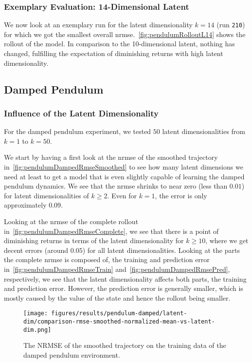 		\subsubsection{Exemplary Evaluation: 14-Dimensional Latent}
			\label{subsubsec:pendulumL14}

			We now look at an exemplary run for the latent dimensionality \( k = 14 \) (run \texttt{210}) for which we got the smallest overall \ac{nrmse}.~\autoref{fig:pendulumRolloutL14} shows the rollout of the model. In comparison to the 10-dimensional latent, nothing has changed, fulfilling the expectation of diminishing returns with high latent dimensionality.

	\subsection{Damped Pendulum}
		\subsubsection{Influence of the Latent Dimensionality}
			For the damped pendulum experiment, we tested \(50\) latent dimensionalities from \( k = 1 \) to \( k = 50 \).

			We start by having a first look at the \ac{nrmse} of the smoothed trajectory in~\autoref{fig:pendulumDampedRmseSmoothed} to see how many latent dimensions we need at least to get a model that is even slightly capable of learning the damped pendulum dynamics. We see that the \ac{nrmse} shrinks to near zero (less than \( 0.01 \)) for latent dimensionalities of \( k \geq 2 \). Even for \( k = 1 \), the error is only approximately \( 0.09 \).

			Looking at the \ac{nrmse} of the complete rollout in~\autoref{fig:pendulumDampedRmseComplete}, we see that there is a point of diminishing returns in terms of the latent dimensionality for \( k \geq 10 \), where we get decent errors (around \( 0.05 \)) for all latent dimensionalities. Looking at the parts the complete \ac{nrmse} is composed of, the training and prediction error in~\autoref{fig:pendulumDampedRmseTrain} and~\autoref{fig:pendulumDampedRmsePred}, respectively, we see that the latent dimensionality affects both parts, the training and prediction error. However, the prediction error is generally smaller, which is mostly caused by the value of the state and hence the rollout being smaller.

			\begin{figure}
				\centering
				\texttt{[image: figures/results/pendulum-damped/latent-dim/comparison-rmse-smoothed-normalized-mean-vs-latent-dim.png]}
				\caption[Error of the smoothed trajectory on the training data of the damped pendulum experiment]{The NRMSE of the smoothed trajectory on the training data of the damped pendulum environment.}
				\label{fig:pendulumDampedRmseSmoothed}
			\end{figure}

